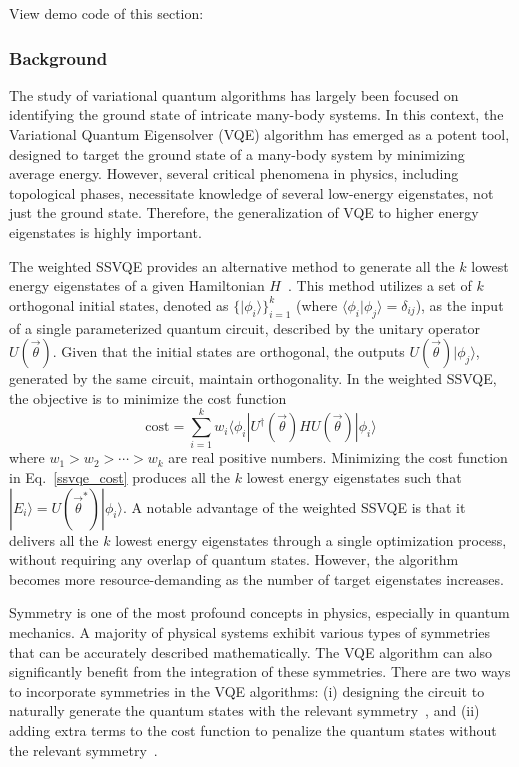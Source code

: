 View demo code of this section: 

\subsubsection{Background}
The study of variational quantum algorithms has largely been focused on identifying the ground state of intricate many-body systems. In this context, the Variational Quantum Eigensolver (VQE) algorithm has emerged as a potent tool, designed to target the ground state of a many-body system by minimizing average energy. However, several critical phenomena in physics, including topological phases, necessitate knowledge of several low-energy eigenstates, not just the ground state. Therefore, the generalization of VQE to higher energy eigenstates is highly important.

The weighted SSVQE provides an alternative method to generate all the $k$ lowest energy eigenstates of a given Hamiltonian $H$~\cite{?}. This method utilizes a set of $k$ orthogonal initial states, denoted as $\{|\phi_{i}\rangle\}_{i=1}^{k}$ (where $\langle \phi_{i} | \phi_{j} \rangle = \delta_{ij}$), as the input of a single parameterized quantum circuit, described by the unitary operator $U(\vec{\theta})$. Given that the initial states are orthogonal, the outputs $U(\vec{\theta})| \phi_{j} \rangle$, generated by the same circuit, maintain orthogonality. In the weighted SSVQE, the objective is to minimize the cost function
\begin{equation}
    \mathrm{cost} = \sum_{i=1}^{k} w_{i} \langle \phi_{i}| U^{\dagger}(\vec{\theta}) H U(\vec{\theta}) | \phi_{i} \rangle
    \label{ssvqe_cost}
\end{equation}
where $w_1 > w_2 > \cdots > w_k$ are real positive numbers. Minimizing the cost function in Eq.~\eqref{ssvqe_cost} produces all the $k$ lowest energy eigenstates such that $|E_{i}\rangle = U(\vec{\theta}^{*})|\phi_{i}\rangle$.
A notable advantage of the weighted SSVQE is that it delivers all the $k$ lowest energy eigenstates through a single optimization process, without requiring any overlap of quantum states. However, the algorithm becomes more resource-demanding as the number of target eigenstates increases.

Symmetry is one of the most profound concepts in physics, especially in quantum mechanics. A majority of physical systems exhibit various types of symmetries that can be accurately described mathematically. The VQE algorithm can also significantly benefit from the integration of these symmetries. There are two ways to incorporate symmetries in the VQE algorithms: (i) designing the circuit to naturally generate the quantum states with the relevant symmetry~\cite{?}, and (ii) adding extra terms to the cost function to penalize the quantum states without the relevant symmetry~\cite{?}.

